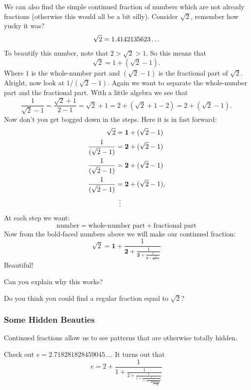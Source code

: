 We can also find the simple continued fraction of numbers which are
not already fractions (otherwise this would all be a bit silly).
Consider $\sqrt{2}$, remember how yucky it was?
\[
\sqrt{2} = 1.4142135623\dots \index{sqrt2@$\sqrt{2}$}
\]
To beautify this number, note that $2>\sqrt{2}>1$. So this means that
\[
\sqrt{2} = 1 + (\sqrt{2} -1).
\]
Where $1$ is the whole-number part and $(\sqrt{2} -1)$ is the
fractional part of $\sqrt{2}$. Alright, now look at
$1/(\sqrt{2}-1)$. Again we want to separate the whole-number part and
the fractional part. With a little algebra we see that
\[
\frac{1}{\sqrt{2}-1} = \frac{\sqrt{2}+1}{2-1} = \sqrt{2}+1 =
2+(\sqrt{2}+1-2) = 2 + (\sqrt{2}-1).
\]
Now don't you get bogged down in the steps. Here it is in fast forward:
\begin{align*}
\sqrt{2} &= \mathbf{1} + (\sqrt{2} -1) \\
\frac{1}{(\sqrt{2} -1)} &= \mathbf{2} + (\sqrt{2}-1) \\
\frac{1}{(\sqrt{2} -1)} &= \mathbf{2} + (\sqrt{2}-1) \\
\frac{1}{(\sqrt{2} -1)} &= \mathbf{2} + (\sqrt{2}-1), \\
&\hspace{.5em}\vdots
\end{align*}
At each step we want:
\[
\text{number} = \text{whole-number part} + \text{fractional part}
\]
Now from the bold-faced numbers above we will make our continued fraction:
\[
\sqrt{2} = \mathbf{1} + \frac{1}{\displaystyle \mathbf{2}
          + \frac{1}{\displaystyle \mathbf{2} 
          + \frac{1}{\displaystyle \mathbf{2} 
       + \frac{1}{\displaystyle \mathbf{2} + \cdots
}}}}
\]
Beautiful!
\begin{ques} Can you explain why this works?
\end{ques}
\QM

\begin{ques} 
Do you think you could find a regular fraction equal to $\sqrt{2}$?
\end{ques}
\QM


\subsubsection{Some Hidden Beauties}

Continued fractions allow us to see patterns that are otherwise
totally hidden.

Check out $e = 2.718281828459045\dots$. It turns out that
\[
e = 2 + \frac{1}{\displaystyle 1
          + \frac{1}{\displaystyle 2 
          + \frac{1}{\displaystyle 1 
       + \frac{1}{\displaystyle 1
          + \frac{1}{\displaystyle 4 
          + \frac{1}{\displaystyle 1 
       + \frac{1}{\displaystyle 1
          + \frac{1}{\displaystyle 6 
          + \frac{1}{\displaystyle 1 + \cdots  
}}}}}}}}}
\]

